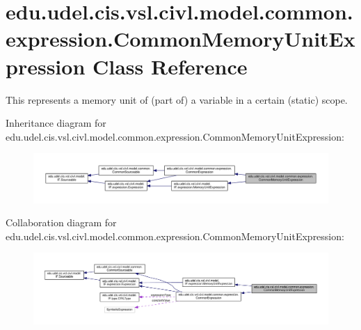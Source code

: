 \hypertarget{classedu_1_1udel_1_1cis_1_1vsl_1_1civl_1_1model_1_1common_1_1expression_1_1CommonMemoryUnitExpression}{}\section{edu.\+udel.\+cis.\+vsl.\+civl.\+model.\+common.\+expression.\+Common\+Memory\+Unit\+Expression Class Reference}
\label{classedu_1_1udel_1_1cis_1_1vsl_1_1civl_1_1model_1_1common_1_1expression_1_1CommonMemoryUnitExpression}


This represents a memory unit of (part of) a variable in a certain (static) scope.  




Inheritance diagram for edu.\+udel.\+cis.\+vsl.\+civl.\+model.\+common.\+expression.\+Common\+Memory\+Unit\+Expression\+:
\nopagebreak
\begin{figure}[H]
\begin{center}
\leavevmode
\includegraphics[width=350pt]{classedu_1_1udel_1_1cis_1_1vsl_1_1civl_1_1model_1_1common_1_1expression_1_1CommonMemoryUnitExpression__inherit__graph}
\end{center}
\end{figure}


Collaboration diagram for edu.\+udel.\+cis.\+vsl.\+civl.\+model.\+common.\+expression.\+Common\+Memory\+Unit\+Expression\+:
\nopagebreak
\begin{figure}[H]
\begin{center}
\leavevmode
\includegraphics[width=350pt]{classedu_1_1udel_1_1cis_1_1vsl_1_1civl_1_1model_1_1common_1_1expression_1_1CommonMemoryUnitExpression__coll__graph}
\end{center}
\end{figure}
